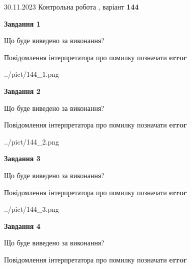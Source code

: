 \documentclass[12pt, ukrainian]{article}
\begin{document}
{{30.11.2023 Контрольна робота , варіант  \No \textbf { 144 }\par}}
{




{\begin {center}\textbf{Завдання 1}\end {center}}\par
Що буде виведено за виконання? \par
Повідомлення інтерпретатора про помилку позначати \textbf{error}

\begin{center}
	{../pict/144_1.png}
\end{center}
\newpage

{\begin {center}\textbf{Завдання 2}\end {center}}\par
Що буде виведено за виконання? \par
Повідомлення інтерпретатора про помилку позначати \textbf{error}

\begin{center}
	{../pict/144_2.png}
\end{center}
\newpage

{\begin {center}\textbf{Завдання 3}\end {center}}\par
Що буде виведено за виконання? \par
Повідомлення інтерпретатора про помилку позначати \textbf{error}

\begin{center}
	{../pict/144_3.png}
\end{center}
\newpage

{\begin {center}\textbf{Завдання 4}\end {center}}\par
Що буде виведено за виконання? \par
Повідомлення інтерпретатора про помилку позначати \textbf{error}

}
\end{document}
